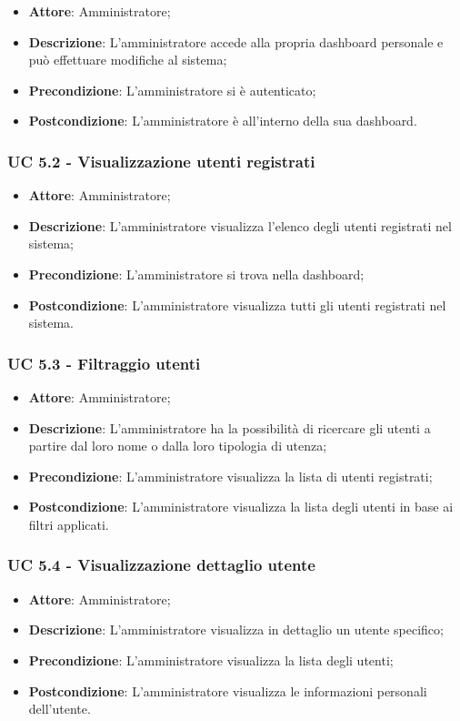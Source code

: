 \begin{itemize}
\item \textbf{Attore}: Amministratore; 
\item \textbf{Descrizione}: L'amministratore accede alla propria dashboard personale e può effettuare modifiche al sistema;
\item \textbf{Precondizione}: L'amministratore si è autenticato;
\item \textbf{Postcondizione}: L'amministratore è all'interno della sua dashboard.
\end{itemize}

\subsubsection{UC 5.2 - Visualizzazione utenti registrati}

\begin{itemize}
\item \textbf{Attore}: Amministratore;
\item \textbf{Descrizione}: L'amministratore visualizza l'elenco degli utenti registrati nel sistema;
\item \textbf{Precondizione}: L'amministratore si trova nella dashboard;
\item \textbf{Postcondizione}: L'amministratore visualizza tutti gli utenti registrati nel sistema.
\end{itemize}

\subsubsection{UC 5.3 - Filtraggio utenti}
\begin{itemize}
\item \textbf{Attore}: Amministratore;
\item \textbf{Descrizione}: L'amministratore ha la possibilità di ricercare gli utenti a partire dal loro nome o dalla loro tipologia di utenza;
\item \textbf{Precondizione}: L'amministratore visualizza la lista di utenti registrati;
\item \textbf{Postcondizione}: L'amministratore visualizza la lista degli utenti in base ai filtri applicati.
\end{itemize}

\subsubsection{UC 5.4 - Visualizzazione dettaglio utente}
\begin{itemize}
\item \textbf{Attore}: Amministratore;
\item \textbf{Descrizione}: L'amministratore visualizza in dettaglio un utente specifico;
\item \textbf{Precondizione}: L'amministratore visualizza la lista degli utenti;
\item \textbf{Postcondizione}: L'amministratore visualizza le informazioni personali dell'utente.
\end{itemize}


